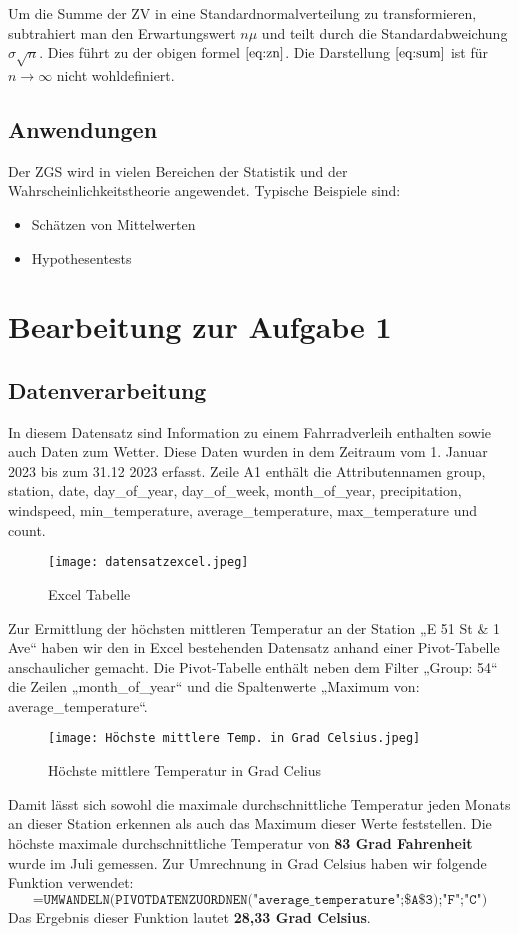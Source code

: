 \documentclass{article}
\begin{document}
Um die Summe der ZV in eine Standardnormalverteilung zu transformieren, subtrahiert man den Erwartungswert $\textit{n}\mu$ und teilt durch die Standardabweichung $\sigma\sqrt{n}$. Dies führt zu der obigen formel $\eqref{eq:zn}$. Die Darstellung $\eqref{eq:sum}$ ist für $\textit{n}\rightarrow\infty$ nicht wohldefiniert.

\subsection{Anwendungen}

Der ZGS wird in vielen Bereichen der Statistik und der Wahrscheinlichkeitstheorie angewendet. Typische Beispiele sind:
\begin{itemize}
    \item Schätzen von Mittelwerten
    \item Hypothesentests
\end{itemize}



\newpage
\section{Bearbeitung zur Aufgabe 1}
\subsection{Datenverarbeitung}
In diesem Datensatz sind Information zu einem Fahrradverleih enthalten sowie auch Daten zum Wetter. Diese Daten wurden in dem Zeitraum vom 1. Januar 2023 bis zum 31.12 2023 erfasst. Zeile A1 enthält die Attributennamen group, station, date, day\_of\_year, day\_of\_week, month\_of\_year, precipitation, windspeed, min\_temperature, average\_temperature, max\_temperature und count.

\begin{figure}[h]
    \centering
    \texttt{[image: datensatzexcel.jpeg]}
    \caption{Excel Tabelle}
    \label{fig:enter-label}
\end{figure}

Zur Ermittlung der höchsten mittleren Temperatur an der Station „E 51 St \& 1 Ave“ haben wir den in Excel bestehenden Datensatz anhand einer Pivot-Tabelle anschaulicher gemacht. 
Die Pivot-Tabelle enthält neben dem Filter „Group: 54“ die Zeilen „month\_of\_year“ und die Spaltenwerte „Maximum von: average\_temperature“.

\begin{figure}[h]
    \centering
    \texttt{[image: Höchste mittlere Temp. in Grad Celsius.jpeg]}
    \caption{Höchste mittlere Temperatur in Grad Celius}
    \label{fig:enter-label}
\end{figure}
\newpage
Damit lässt sich sowohl die maximale durchschnittliche Temperatur jeden Monats
an dieser Station erkennen als auch das Maximum dieser Werte feststellen. 
Die höchste maximale durchschnittliche Temperatur von \textbf{83 Grad Fahrenheit} wurde im Juli gemessen. Zur Umrechnung in Grad Celsius haben wir folgende Funktion verwendet:
\[
\texttt{=UMWANDELN(PIVOTDATENZUORDNEN("average\_temperature";\$A\$3);"F";"C")}
\]
Das Ergebnis dieser Funktion lautet \textbf{28,33 Grad Celsius}.
\end{document}
